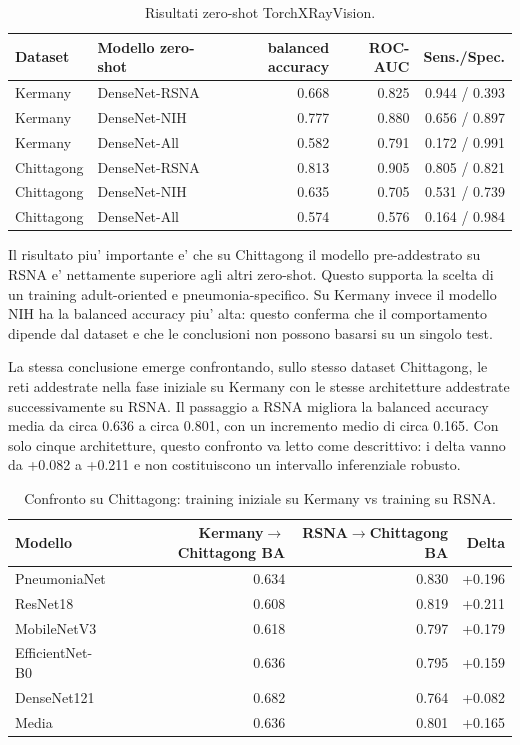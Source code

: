 \documentclass[11pt,a4paper]{article}
\newcommand{\balacc}{balanced accuracy}
\newcommand{\auc}{ROC-AUC}
\begin{document}
\begin{table}[H]
\centering
\caption{Risultati zero-shot TorchXRayVision.}
\begin{tabular}{llrrr}
\toprule
Dataset & Modello zero-shot & \balacc & \auc & Sens./Spec. \\
\midrule
Kermany & DenseNet-RSNA & 0.668 & 0.825 & 0.944 / 0.393 \\
Kermany & DenseNet-NIH & 0.777 & 0.880 & 0.656 / 0.897 \\
Kermany & DenseNet-All & 0.582 & 0.791 & 0.172 / 0.991 \\
Chittagong & DenseNet-RSNA & 0.813 & 0.905 & 0.805 / 0.821 \\
Chittagong & DenseNet-NIH & 0.635 & 0.705 & 0.531 / 0.739 \\
Chittagong & DenseNet-All & 0.574 & 0.576 & 0.164 / 0.984 \\
\bottomrule
\end{tabular}
\end{table}

Il risultato piu' importante e' che su Chittagong il modello pre-addestrato su
RSNA e' nettamente superiore agli altri zero-shot. Questo supporta la scelta di
un training adult-oriented e pneumonia-specifico. Su Kermany invece il modello
NIH ha la \balacc{} piu' alta: questo conferma che il comportamento dipende dal
dataset e che le conclusioni non possono basarsi su un singolo test.

La stessa conclusione emerge confrontando, sullo stesso dataset Chittagong, le
reti addestrate nella fase iniziale su Kermany con le stesse architetture
addestrate successivamente su RSNA. Il passaggio a RSNA migliora la \balacc{}
media da circa 0.636 a circa 0.801, con un incremento medio di circa 0.165. Con
solo cinque architetture, questo confronto va letto come descrittivo: i delta
vanno da +0.082 a +0.211 e non costituiscono un intervallo inferenziale robusto.

\begin{table}[H]
\centering
\caption{Confronto su Chittagong: training iniziale su Kermany vs training su RSNA.}
\begin{tabular}{lrrr}
\toprule
Modello & Kermany$\rightarrow$Chittagong BA & RSNA$\rightarrow$Chittagong BA & Delta \\
\midrule
PneumoniaNet & 0.634 & 0.830 & +0.196 \\
ResNet18 & 0.608 & 0.819 & +0.211 \\
MobileNetV3 & 0.618 & 0.797 & +0.179 \\
EfficientNet-B0 & 0.636 & 0.795 & +0.159 \\
DenseNet121 & 0.682 & 0.764 & +0.082 \\
\midrule
Media & 0.636 & 0.801 & +0.165 \\
\bottomrule
\end{tabular}
\end{table}
\end{document}
